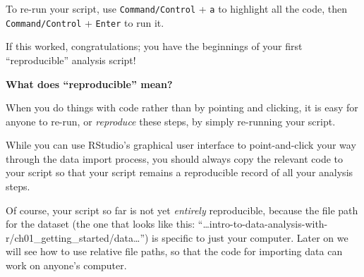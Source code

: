 \documentclass[
  letterpaper,
  DIV=11,
  numbers=noendperiod]{scrreprt}
\begin{document}
To re-run your script, use \texttt{Command/Control} + \texttt{a} to
highlight all the code, then \texttt{Command/Control} + \texttt{Enter}
to run it.

If this worked, congratulations; you have the beginnings of your first
``reproducible'' analysis script!

\begin{tcolorbox}[enhanced jigsaw, colframe=quarto-callout-note-color-frame, rightrule=.15mm, opacityback=0, breakable, coltitle=black, colbacktitle=quarto-callout-note-color!10!white, bottomrule=.15mm, leftrule=.75mm, toprule=.15mm, arc=.35mm, bottomtitle=1mm, colback=white, left=2mm, opacitybacktitle=0.6, titlerule=0mm, title=\textcolor{quarto-callout-note-color}{\faInfo}\hspace{0.5em}{Vocab}, toptitle=1mm]

\textbf{What does ``reproducible'' mean?}

When you do things with code rather than by pointing and clicking, it is
easy for anyone to re-run, or \emph{reproduce} these steps, by simply
re-running your script.

While you can use RStudio's graphical user interface to point-and-click
your way through the data import process, you should always copy the
relevant code to your script so that your script remains a reproducible
record of all your analysis steps.

Of course, your script so far is not yet \emph{entirely} reproducible,
because the file path for the dataset (the one that looks like this:
``\ldots intro-to-data-analysis-with-r/ch01\_getting\_started/data\ldots{}'')
is specific to just your computer. Later on we will see how to use
relative file paths, so that the code for importing data can work on
anyone's computer.

\end{tcolorbox}
\end{document}
